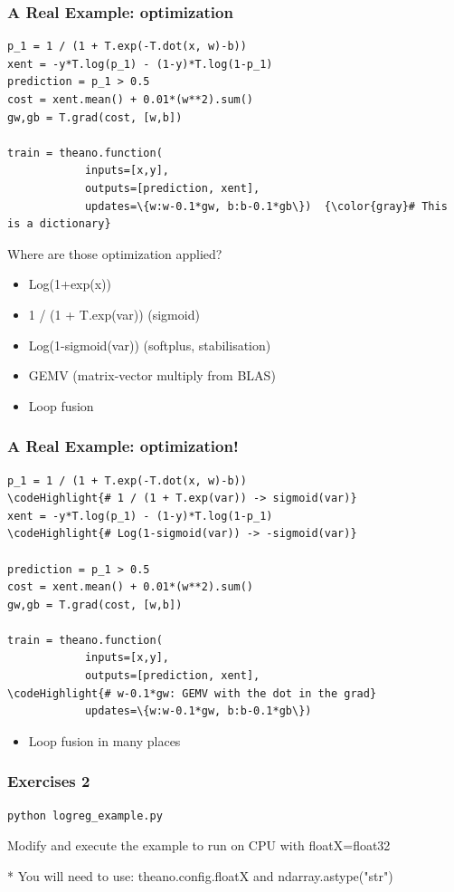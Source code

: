 \documentclass[a4paper,9pt]{beamer}
\begin{document}
\begin{frame}[fragile]
  \frametitle{A Real Example: optimization}
\begin{Verbatim}[commandchars=\\\{\}]
p_1 = 1 / (1 + T.exp(-T.dot(x, w)-b))
xent = -y*T.log(p_1) - (1-y)*T.log(1-p_1)
prediction = p_1 > 0.5
cost = xent.mean() + 0.01*(w**2).sum()
gw,gb = T.grad(cost, [w,b])

train = theano.function(
            inputs=[x,y],
            outputs=[prediction, xent],
            updates=\{w:w-0.1*gw, b:b-0.1*gb\})  {\color{gray}# This is a dictionary}
\end{Verbatim}
Where are those optimization applied?
\begin{itemize}
\item Log(1+exp(x))
\item 1 / (1 + T.exp(var)) (sigmoid)
\item Log(1-sigmoid(var)) (softplus, stabilisation)
\item GEMV (matrix-vector multiply from BLAS)
\item Loop fusion
\end{itemize}
\end{frame}

\begin{frame}[fragile]
  \frametitle{A Real Example: optimization!}
\begin{Verbatim}[commandchars=\\\{\}]
p_1 = 1 / (1 + T.exp(-T.dot(x, w)-b))
\codeHighlight{# 1 / (1 + T.exp(var)) -> sigmoid(var)}
xent = -y*T.log(p_1) - (1-y)*T.log(1-p_1)
\codeHighlight{# Log(1-sigmoid(var)) -> -sigmoid(var)}

prediction = p_1 > 0.5
cost = xent.mean() + 0.01*(w**2).sum()
gw,gb = T.grad(cost, [w,b])

train = theano.function(
            inputs=[x,y],
            outputs=[prediction, xent],
\codeHighlight{# w-0.1*gw: GEMV with the dot in the grad}
            updates=\{w:w-0.1*gw, b:b-0.1*gb\})

\end{Verbatim}
\begin{itemize}
\item Loop fusion in many places
\end{itemize}
\end{frame}

\begin{frame}[fragile]
\frametitle{Exercises 2}
\begin{Verbatim}
python logreg_example.py
\end{Verbatim}
\vfill
Modify and execute the example to run on CPU with floatX=float32

* You will need to use: theano.config.floatX and ndarray.astype("str")
\end{frame}
\end{document}
